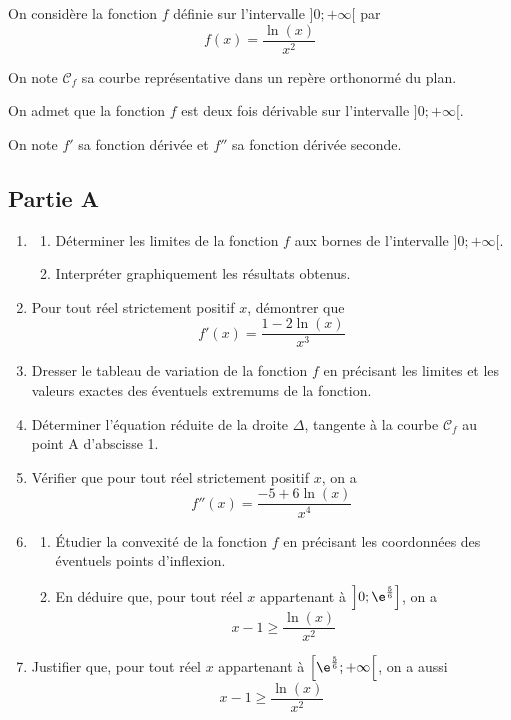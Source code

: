 On considère la fonction $f$ définie sur l'intervalle $] 0 ; +\infty[$ par \quad \[f(x)=\dfrac{\ln (x)}{x^{2}}\]
	
	On note $\mathcal{C}_{f}$ sa courbe représentative dans un repère orthonormé du plan.
	
	On admet que la fonction $f$ est deux fois dérivable sur l'intervalle $]0 ; +\infty[$.
	
	On note $f'$ sa fonction dérivée et $f''$ sa fonction dérivée seconde.
	
	\subsection*{Partie A}
	\begin{enumerate}
		\item \begin{enumerate}
			\item Déterminer les limites de la fonction $f$ aux bornes de l'intervalle $] 0;+\infty[$.
			
			\item Interpréter graphiquement les résultats obtenus.
		\end{enumerate}
		
		\item Pour tout réel strictement positif $x$, démontrer que \quad
		\[f'(x)=\dfrac{1-2 \ln (x)}{x^{3}}\]
		
		\item Dresser le tableau de variation de la fonction $f$ en précisant les limites et les valeurs exactes des éventuels extremums de la fonction.
		
		\item Déterminer l'équation réduite de la droite $\Delta$, tangente à la courbe $\mathcal{C}_{f}$ au point A d'abscisse 1.
		
		\item Vérifier que pour tout réel strictement positif $x$, on a \quad \[f''(x)=\dfrac{-5+6 \ln (x)}{x^{4}}\]
		
		\item \begin{enumerate}
			\item Étudier la convexité de la fonction $f$ en précisant les coordonnées des éventuels points d'inflexion.
			
			\item En déduire que, pour tout réel $x$ appartenant à $\left]0 ; \e^{\frac{5}{6}}\right]$, on a \quad
			\[x-1 \geqslant \dfrac{\ln (x)}{x^{2}}\]
		\end{enumerate}
		
		\item Justifier que, pour tout réel $x$ appartenant à $\left[\e^{\frac{5}{6}} ; +\infty\right[$, on a aussi
		\[x-1 \geqslant  \dfrac{\ln (x)}{x^{2}}\]
	\end{enumerate}
	
